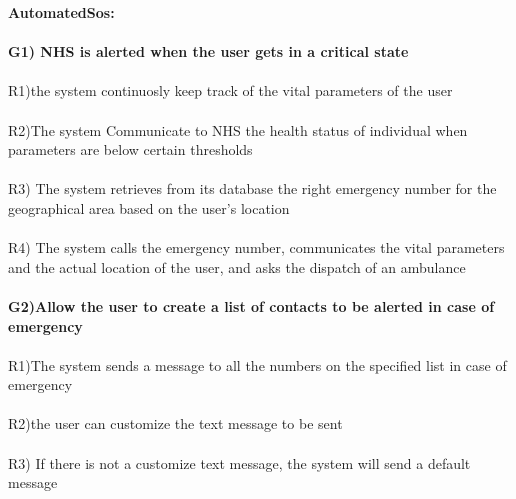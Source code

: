 \textbf{AutomatedSos:} \\ \\ 
\textbf{G1) NHS is alerted when the user gets in a critical state} \\ \\
R1)the system continuosly keep track of the vital parameters of the user \\ \\
R2)The system Communicate to NHS the health status of individual when parameters are below certain thresholds \\ \\
R3) The system retrieves from its database the right emergency number for the geographical area based on the user’s location \\ \\

R4) The system calls the emergency number, communicates the vital parameters and the actual location of the user, and asks the dispatch of an ambulance \\ \\

\textbf{G2)Allow the user to create a list of contacts to be alerted  in case of emergency} \\ \\

R1)The system sends a message to all the numbers on the specified list in case of emergency \\ \\
R2)the user can customize the  text message to be sent \\ \\
R3) If there is not a customize text message, the system will send a default message \\ \\

